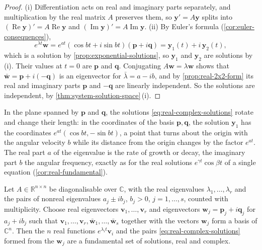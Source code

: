 \begin{proof}
(i) Differentiation acts on real and imaginary parts separately, and multiplication by the real matrix $A$ preserves them, so $\mathbf y'=A\mathbf y$ splits into $(\operatorname{Re}\mathbf y)'=A\operatorname{Re}\mathbf y$ and $(\operatorname{Im}\mathbf y)'=A\operatorname{Im}\mathbf y$. (ii) By Euler's formula (\cref{cor:euler-consequences}),
\[
e^{\lambda t}\mathbf w=e^{at}(\cos bt+i\sin bt)(\mathbf p+i\mathbf q)=\mathbf y_1(t)+i\,\mathbf y_2(t),
\]
which is a solution by \cref{prop:exponential-solutions}, so $\mathbf y_1$ and $\mathbf y_2$ are solutions by (i). Their values at $t=0$ are $\mathbf p$ and $\mathbf q$. Conjugating $A\mathbf w=\lambda\mathbf w$ shows that $\bar{\mathbf w}=\mathbf p+i(-\mathbf q)$ is an eigenvector for $\bar\lambda=a-ib$, and by \cref{prop:real-2x2-form} its real and imaginary parts $\mathbf p$ and $-\mathbf q$ are linearly independent. So the solutions are independent, by \cref{thm:system-solution-space}\,(i).
\end{proof}

In the plane spanned by $\mathbf p$ and $\mathbf q$, the solutions \eqref{eq:real-complex-solutions} rotate and change their length: in the coordinates of the basis $\mathbf p,\mathbf q$, the solution $\mathbf y_1$ has the coordinates $e^{at}(\cos bt,-\sin bt)$, a point that turns about the origin with the angular velocity $b$ while its distance from the origin changes by the factor $e^{at}$. The real part $a$ of the eigenvalue is the rate of growth or decay, the imaginary part $b$ the angular frequency, exactly as for the real solutions $e^{\gamma t}\cos\beta t$ of a single equation (\cref{cor:real-fundamental}).

\begin{corollary}
\label{cor:real-fundamental-system}
Let $A\in\mathbb R^{n\times n}$ be diagonalisable over $\mathbb C$, with the real eigenvalues $\lambda_1,\ldots,\lambda_r$ and the pairs of nonreal eigenvalues $a_j\pm ib_j$, $b_j>0$, $j=1,\ldots,s$, counted with multiplicity. Choose real eigenvectors $\mathbf v_1,\ldots,\mathbf v_r$ and eigenvectors $\mathbf w_j=\mathbf p_j+i\mathbf q_j$ for $a_j+ib_j$ such that $\mathbf v_1,\ldots,\mathbf v_r,\bar{\mathbf w}_1,\ldots,\bar{\mathbf w}_s$ together with the vectors $\mathbf w_j$ form a basis of $\mathbb C^n$. Then the $n$ real functions $e^{\lambda_it}\mathbf v_i$ and the pairs \eqref{eq:real-complex-solutions} formed from the $\mathbf w_j$ are a fundamental set of solutions, real and complex.
\end{corollary}

